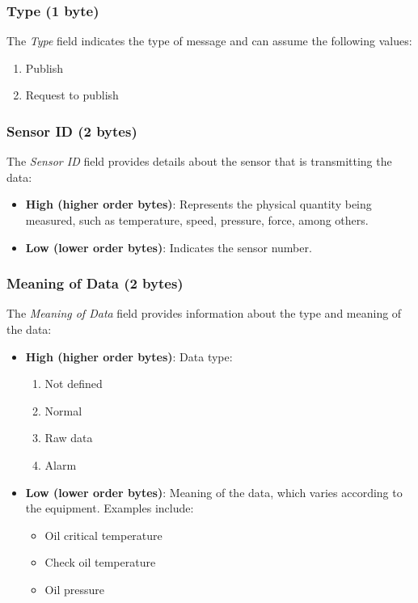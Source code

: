 \subsubsection{Type (1 byte)}

The \textit{Type} field indicates the type of message and can assume the following values:
\begin{enumerate}
    \item Publish
    \item Request to publish
\end{enumerate}

\subsubsection{Sensor ID (2 bytes)}

The \textit{Sensor ID} field provides details about the sensor that is transmitting the data:

\begin{itemize}
    \item \textbf{High (higher order bytes)}: Represents the physical quantity being measured, such as temperature, speed, pressure, force, among others.
    \item \textbf{Low (lower order bytes)}: Indicates the sensor number.
\end{itemize}\subsubsection{Meaning of Data (2 bytes)}

The \textit{Meaning of Data} field provides information about the type and meaning of the data:

\begin{itemize}
    \item \textbf{High (higher order bytes)}: Data type:
    \begin{enumerate}
        \item Not defined
        \item Normal
        \item Raw data
        \item Alarm
    \end{enumerate}
    \item \textbf{Low (lower order bytes)}: Meaning of the data, which varies according to the equipment. Examples include:
    \begin{itemize}
        \item Oil critical temperature
        \item Check oil temperature
        \item Oil pressure
\end{itemize}
\end{itemize}

